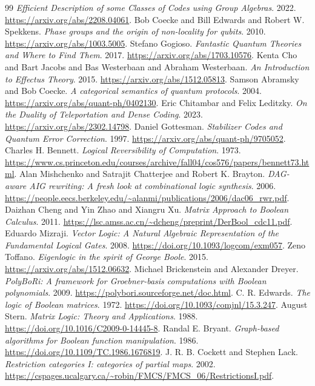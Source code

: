 \begin{thebibliography}{99}
\emph{Efficient Description of some Classes of Codes using Group Algebras}. 2022.
\url{https://arxiv.org/abs/2208.04061}.
Bob Coecke and Bill Edwards and Robert W. Spekkens.
\emph{Phase groups and the origin of non-locality for qubits}. 2010.
\url{https://arxiv.org/abs/1003.5005}.
Stefano Gogioso.
\emph{Fantastic Quantum Theories and Where to Find Them}. 2017.
\url{https://arxiv.org/abs/1703.10576}.
Kenta Cho and Bart Jacobs and Bas Westerbaan and Abraham Westerbaan.
\emph{An Introduction to Effectus Theory}. 2015.
\url{https://arxiv.org/abs/1512.05813}.
Samson Abramsky and Bob Coecke.
\emph{A categorical semantics of quantum protocols}. 2004.
\url{https://arxiv.org/abs/quant-ph/0402130}.
Eric Chitambar and Felix Leditzky.
\emph{On the Duality of Teleportation and Dense Coding}. 2023.
\url{https://arxiv.org/abs/2302.14798}.
Daniel Gottesman.
\emph{Stabilizer Codes and Quantum Error Correction}. 1997.
\url{https://arxiv.org/abs/quant-ph/9705052}.
Charles H. Bennett.
\emph{Logical Reversibility of Computation}. 1973.
\url{https://www.cs.princeton.edu/courses/archive/fall04/cos576/papers/bennett73.html}.
Alan Mishchenko and Satrajit Chatterjee and Robert K. Brayton.
\emph{DAG-aware AIG rewriting: A fresh look at combinational logic synthesis}. 2006.
\url{https://people.eecs.berkeley.edu/~alanmi/publications/2006/dac06_rwr.pdf}.
Daizhan Cheng and Yin Zhao and Xiangru Xu.
\emph{Matrix Approach to Boolean Calculus}. 2011.
\url{https://lsc.amss.ac.cn/~dcheng/preprint/DerBool_cdc11.pdf}.
Eduardo Mizraji.
\emph{Vector Logic: A Natural Algebraic Representation of the Fundamental Logical Gates}. 2008.
\url{https://doi.org/10.1093/logcom/exm057}.
Zeno Toffano.
\emph{Eigenlogic in the spirit of George Boole}. 2015.
\url{https://arxiv.org/abs/1512.06632}.
Michael Brickenstein and Alexander Dreyer.
\emph{PolyBoRi: A framework for Groebner-basis computations with Boolean polynomials}. 2009.
\url{https://polybori.sourceforge.net/doc.html}.
C. R. Edwards.
\emph{The logic of Boolean matrices}. 1972.
\url{https://doi.org/10.1093/comjnl/15.3.247}.
August Stern.
\emph{Matrix Logic: Theory and Applications}. 1988.
\url{https://doi.org/10.1016/C2009-0-14445-8}.
Randal E. Bryant.
\emph{Graph-based algorithms for Boolean function manipulation}. 1986.
\url{https://doi.org/10.1109/TC.1986.1676819}.
J. R. B. Cockett and Stephen Lack.
\emph{Restriction categories I: categories of partial maps}. 2002.
\url{https://cspages.ucalgary.ca/~robin/FMCS/FMCS_06/RestrictionsI.pdf}.
\end{thebibliography}
